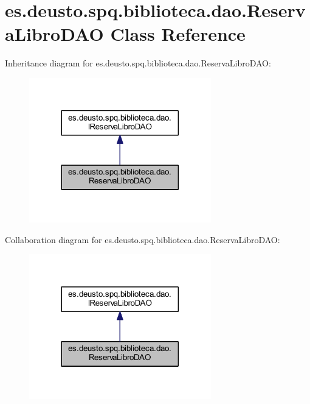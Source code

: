 \hypertarget{classes_1_1deusto_1_1spq_1_1biblioteca_1_1dao_1_1_reserva_libro_d_a_o}{}\section{es.\+deusto.\+spq.\+biblioteca.\+dao.\+Reserva\+Libro\+D\+AO Class Reference}
\label{classes_1_1deusto_1_1spq_1_1biblioteca_1_1dao_1_1_reserva_libro_d_a_o}


Inheritance diagram for es.\+deusto.\+spq.\+biblioteca.\+dao.\+Reserva\+Libro\+D\+AO\+:
\nopagebreak
\begin{figure}[H]
\begin{center}
\leavevmode
\includegraphics[width=224pt]{classes_1_1deusto_1_1spq_1_1biblioteca_1_1dao_1_1_reserva_libro_d_a_o__inherit__graph}
\end{center}
\end{figure}


Collaboration diagram for es.\+deusto.\+spq.\+biblioteca.\+dao.\+Reserva\+Libro\+D\+AO\+:
\nopagebreak
\begin{figure}[H]
\begin{center}
\leavevmode
\includegraphics[width=224pt]{classes_1_1deusto_1_1spq_1_1biblioteca_1_1dao_1_1_reserva_libro_d_a_o__coll__graph}
\end{center}
\end{figure}

